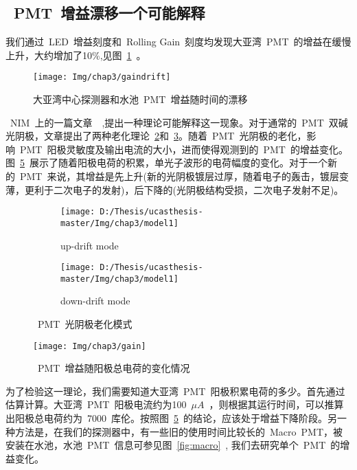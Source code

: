 \subsection{~PMT~增益漂移一个可能解释}
我们通过~LED~增益刻度和~Rolling Gain~刻度均发现大亚湾~PMT~的增益在缓慢上升，大约增加了10\%,见图~\ref{fig:gaindrift}~。
\begin{figure}[!htb]
  \centering
   \texttt{[image: Img/chap3/gaindrift]}
    \caption{ 大亚湾中心探测器和水池~PMT~增益随时间的漂移}
  \label{fig:gaindrift}
\end{figure}
~NIM~上的一篇文章~\citep{aiello2013aging}~,提出一种理论可能解释这一现象。对于通常的~PMT~双碱光阴极，文章提出了两种老化理论~\ref{fig:model_1}和~\ref{fig:model_2}。随着~PMT~光阴极的老化，影响~PMT~阳极灵敏度及输出电流的大小，进而使得观测到的~PMT~的增益变化。图~\ref{fig:gain}~展示了随着阳极电荷的积累，单光子波形的电荷幅度的变化。对于一个新的~PMT~来说，其增益是先上升(新的光阴极镀层过厚，随着电子的轰击，镀层变薄，更利于二次电子的发射)，后下降的(光阴极结构受损，二次电子发射不足)。
\begin{figure}[!htb]
  \centering
  \begin{subfigure}[b]{\MySubFactor\textwidth}
    \texttt{[image: D:/Thesis/ucasthesis-master/Img/chap3/model1]}
    \caption{up-drift mode}
    \label{fig:model_1}
  \end{subfigure}%
  \begin{subfigure}[b]{\MySubFactor\textwidth}
    \texttt{[image: D:/Thesis/ucasthesis-master/Img/chap3/model1]}
    \caption{down-drift mode}
    \label{fig:model_2}
  \end{subfigure}
\caption{~PMT~光阴极老化模式}
  \label{fig:model}
\end{figure}
\begin{figure}[!htb]
  \centering
   \texttt{[image: Img/chap3/gain]}
    \caption{ ~PMT~增益随阳极总电荷的变化情况}
  \label{fig:gain}
\end{figure}
为了检验这一理论，我们需要知道大亚湾~PMT~阳极积累电荷的多少。首先通过估算计算。大亚湾~PMT~阳极电流约为100~$\mu A$~，则根据其运行时间，可以推算出阳极总电荷约为~7000~库伦。按照图~\ref{fig:gain}~的结论，应该处于增益下降阶段。另一种方法是，在我们的探测器中，有一些旧的使用时间比较长的~Macro~PMT，被安装在水池，水池~PMT~信息可参见图~\ref{fig:macro}~, 我们去研究单个~PMT~的增益变化。


